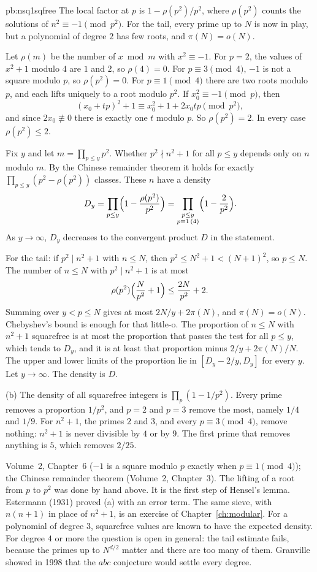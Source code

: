 \begin{solution}{pb:nsq1sqfree}
\idea The local factor at $p$ is $1-\rho(p^2)/p^2$, where $\rho(p^2)$ counts the solutions of $n^2\equiv-1\pmod{p^2}$. For the tail, every prime up to $N$ is now in play, but a polynomial of degree $2$ has few roots, and $\pi(N)=o(N)$.

\writeup Let $\rho(m)$ be the number of $x\bmod m$ with $x^2\equiv-1$. For $p=2$, the values of $x^2+1$ modulo $4$ are $1$ and $2$, so $\rho(4)=0$. For $p\equiv3\pmod4$, $-1$ is not a square modulo $p$, so $\rho(p^2)=0$. For $p\equiv1\pmod4$ there are two roots modulo $p$, and each lifts uniquely to a root modulo $p^2$. If $x_0^2\equiv-1\pmod p$, then
\[
(x_0+tp)^2+1\equiv x_0^2+1+2x_0 tp\pmod{p^2},
\]
and since $2x_0\not\equiv0$ there is exactly one $t$ modulo $p$. So $\rho(p^2)=2$. In every case $\rho(p^2)\le2$.

Fix $y$ and let $m=\prod_{p\le y}p^2$. Whether $p^2\nmid n^2+1$ for all $p\le y$ depends only on $n$ modulo $m$. By the Chinese remainder theorem it holds for exactly $\prod_{p\le y}(p^2-\rho(p^2))$ classes. These $n$ have a density
\[
D_y=\prod_{p\le y}\Bigl(1-\frac{\rho(p^2)}{p^2}\Bigr)=\prod_{\substack{p\le y\\p\equiv1\,(4)}}\Bigl(1-\frac2{p^2}\Bigr).
\]
As $y\to\infty$, $D_y$ decreases to the convergent product $D$ in the statement.

For the tail: if $p^2\mid n^2+1$ with $n\le N$, then $p^2\le N^2+1<(N+1)^2$, so $p\le N$. The number of $n\le N$ with $p^2\mid n^2+1$ is at most
\[
\rho(p^2)\Bigl(\frac N{p^2}+1\Bigr)\le\frac{2N}{p^2}+2.
\]
Summing over $y<p\le N$ gives at most $2N/y+2\pi(N)$, and $\pi(N)=o(N)$. Chebyshev's bound is enough for that little-o. The proportion of $n\le N$ with $n^2+1$ squarefree is at most the proportion that passes the test for all $p\le y$, which tends to $D_y$, and it is at least that proportion minus $2/y+2\pi(N)/N$. The upper and lower limits of the proportion lie in $[D_y-2/y,D_y]$ for every $y$. Let $y\to\infty$. The density is $D$.

(b) The density of all squarefree integers is $\prod_p(1-1/p^2)$. Every prime removes a proportion $1/p^2$, and $p=2$ and $p=3$ remove the most, namely $1/4$ and $1/9$. For $n^2+1$, the primes $2$ and $3$, and every $p\equiv3\pmod4$, remove nothing: $n^2+1$ is never divisible by $4$ or by $9$. The first prime that removes anything is $5$, which removes $2/25$.

\tools Volume~2, Chapter~6 ($-1$ is a square modulo $p$ exactly when $p\equiv1\pmod4$); the Chinese remainder theorem (Volume~2, Chapter~3). The lifting of a root from $p$ to $p^2$ was done by hand above. It is the first step of Hensel's lemma.
\leads Estermann (1931) proved (a) with an error term. The same sieve, with $n(n+1)$ in place of $n^2+1$, is an exercise of Chapter~\ref{ch:modular}. For a polynomial of degree $3$, squarefree values are known to have the expected density. For degree $4$ or more the question is open in general: the tail estimate fails, because the primes up to $N^{d/2}$ matter and there are too many of them. Granville showed in 1998 that the $abc$ conjecture would settle every degree.
\end{solution}

